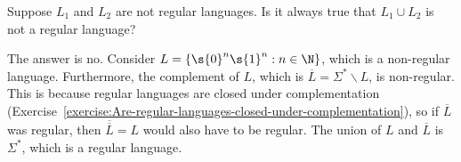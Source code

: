\begin{flex}
\label{grp:exercise:Union-of-irregular-languages}

\begin{exercise}
\label{exercise:Union-of-irregular-languages}
Suppose $L_1$ and $L_2$ are not regular languages. 
Is it always true that $L_1 \cup L_2$ is not a regular language?

\end{exercise}

\begin{solution}
\label{sol:deterministic-finite-automata::consider}
The answer is no. Consider $L = \{\s{0}^n\s{1}^n : n \in \N\}$, which is a non-regular language. Furthermore, the complement of $L$, which is $\overline{L} = \Sigma^* \backslash L$, is non-regular. This is because regular languages are closed under complementation (Exercise~\ref{exercise:Are-regular-languages-closed-under-complementation}), so if $\overline{L}$ was regular, then $\overline{\overline{L}} = L$ would also have to be regular. The union of $L$ and $\overline{L}$ is $\Sigma^*$, which is a regular language.

\end{solution}
\end{flex}

